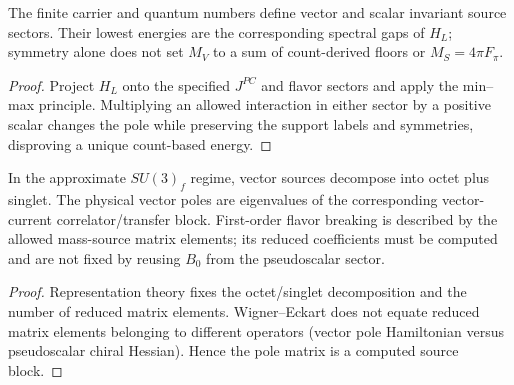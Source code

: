 \documentclass[12pt,a4paper]{article}
\begin{document}
\begin{theorem}
\label{p11:thm:leading-transverse-contact-support-selection}

The finite carrier and quantum numbers define vector and scalar invariant source sectors.  Their lowest energies are the corresponding spectral gaps of \(H_L\); symmetry alone does not set \(M_V\) to a sum of count-derived floors or \(M_S=4\pi F_\pi\).
\label{p11:eq:leading-vector-support-selection}
\label{p11:eq:leading-scalar-contact-selection}
\end{theorem}
\begin{proof}

Project \(H_L\) onto the specified \(J^{PC}\) and flavor sectors and apply the min--max principle.  Multiplying an allowed interaction in either sector by a positive scalar changes the pole while preserving the support labels and symmetries, disproving a unique count-based energy.
\end{proof}

\begin{theorem}
\label{p11:thm:native-leading-vector-nonet}

In the approximate \(SU(3)_f\) regime, vector sources decompose into octet plus singlet.  The physical vector poles are eigenvalues of the corresponding vector-current correlator/transfer block.  First-order flavor breaking is described by the allowed mass-source matrix elements; its reduced coefficients must be computed and are not fixed by reusing \(B_0\) from the pseudoscalar sector.
\label{p11:eq:native-vector-base-mass}
\label{p11:eq:native-vector-mass-square-operator}
\label{p11:eq:native-vector-nonet-numeric}
\label{p11:eq:native-vector-gmo}
\end{theorem}
\begin{proof}

Representation theory fixes the octet/singlet decomposition and the number of reduced matrix elements.  Wigner--Eckart does not equate reduced matrix elements belonging to different operators (vector pole Hamiltonian versus pseudoscalar chiral Hessian).  Hence the pole matrix is a computed source block.
\end{proof}
\end{document}
